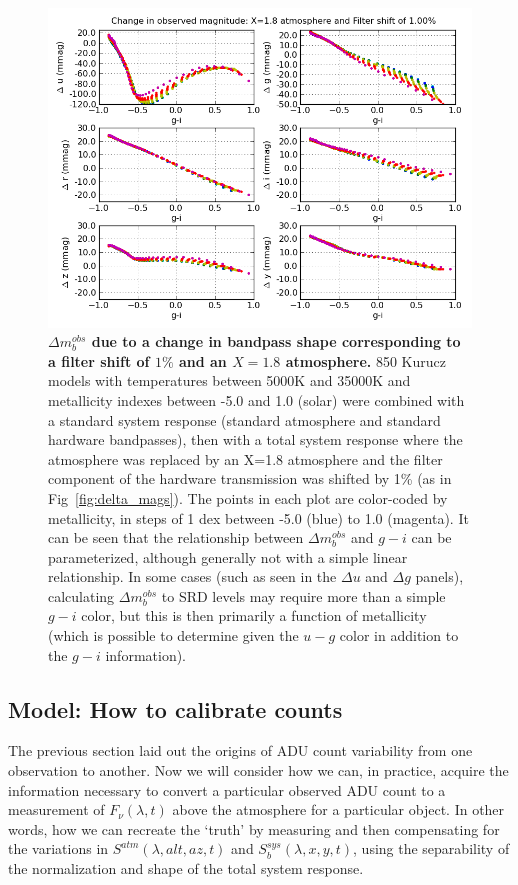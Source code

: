 \documentclass[12pt,preprint]{aastex}
\begin{document}
\begin{figure}[htbp]
\includegraphics[width=6in]{delta_mags2}
\caption{ {\small {\bf $\Delta m_b^{obs}$ due to
a change in bandpass shape corresponding to a filter shift of $1\%$
and an $X=1.8$ atmosphere.} 850 Kurucz models with temperatures
between 5000K and 35000K and metallicity indexes between -5.0 and 1.0
(solar) were combined with a standard system response (standard
atmosphere and standard hardware bandpasses), then with a total system
response where the atmosphere was replaced by an X=1.8 atmosphere and
the filter component of the hardware transmission was shifted by 1\%
(as in Fig~\ref{fig:delta_mags}). The points in each plot are color-coded by
metallicity, in steps of 1 dex between -5.0 (blue) to 1.0 (magenta).  It can be seen that the
relationship between $\Delta m_b^{obs}$ and $g-i$ can be parameterized,
although generally not with a simple linear relationship. In some
cases (such as seen in the $\Delta u$ and $\Delta g$ panels),
calculating $\Delta m_b^{obs}$ to SRD levels may require more than a simple
$g-i$ color, but this is then primarily a function of metallicity
(which is possible to determine given the $u-g$ color in addition to
the $g-i$ information). }
\label{fig:delta_mags2} }
\end{figure}


\subsection{Model: How to calibrate counts}
\label{sec:counts2photons}

The previous section laid out the origins of ADU count variability
from one observation to another. Now we will consider how we can, in
practice, acquire the information necessary to convert a particular
observed ADU count to a measurement of $F_\nu(\lambda,t)$ above the
atmosphere for a particular object.  In other words, how we can
recreate the `truth' by measuring and then compensating for the variations in
$S^{atm}(\lambda,alt,az,t)$ and $S_b^{sys}(\lambda,x,y,t)$, using the
separability of the normalization and shape of the total system
response.
\end{document}
